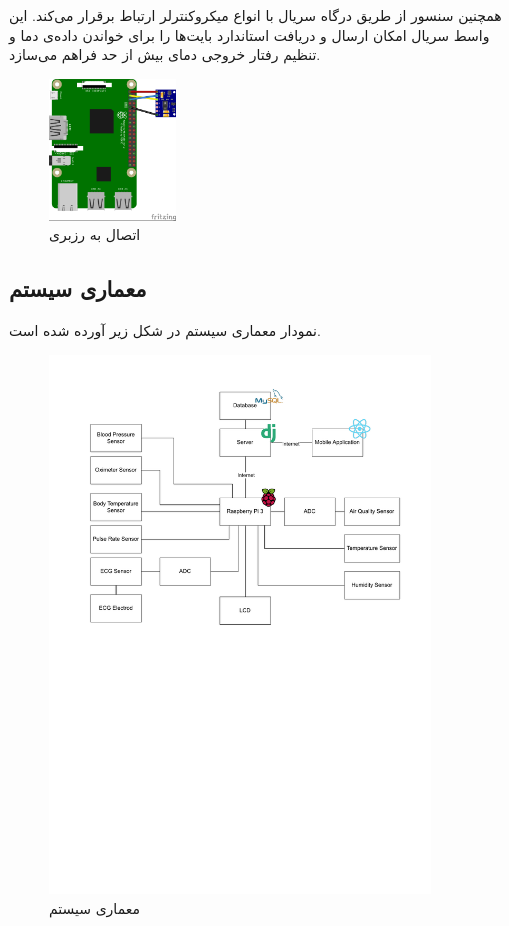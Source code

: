 \documentclass[12pt]{article}
\begin{document}
همچنین سنسور
از طریق درگاه سریال
با انواع میکروکنترلر ارتباط برقرار می‌کند. این واسط سریال امکان ارسال و دریافت استاندارد بایت‌ها را برای خواندن داده‌ی دما و تنظیم رفتار خروجی دمای بیش از حد فراهم می‌‌سازد.

\begin{figure}[h]
	\begin{center}
		\includegraphics[width=0.3\textwidth]{max30102-raspberry}
	\end{center}
	\caption{اتصال  به رزبری}
\end{figure}


\newpage
\subsection{معماری سیستم}

نمودار معماری سیستم در شکل زیر آورده شده است.


\begin{figure}[h]
	\begin{center}
		\includegraphics[width=0.9\textwidth,trim={0 10cm 0 0},clip]{drawio}
	\end{center}
	\caption{معماری سیستم}
\end{figure}
\newpage
\end{document}
